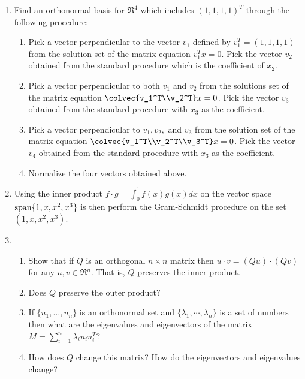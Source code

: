 \begin{enumerate}




\item Find an orthonormal  basis for $\Re^4$ which includes $(1,1,1,1)^T$ through the following procedure:\\
\begin{enumerate} 
\item Pick a vector perpendicular to the vector $v_1$ defined by $v_1^T=(1,1,1,1)$ from the solution set of the matrix equation $v_1^Tx=0$. Pick the vector $v_2$ obtained from the standard procedure which is the coefficient of $x_2$.
\item Pick a vector perpendicular to both $v_1$ and $v_2$ from the solutions set of the matrix equation $\colvec{v_1^T\\v_2^T}x=0$. Pick the vector $v_3$ obtained from the standard procedure with $x_3$ as the coefficient. 
\item Pick a vector perpendicular to $v_1,v_2,$ and $v_3$ from the solution set of the matrix equation $\colvec{v_1^T\\v_2^T\\v_3^T}x=0$.  Pick the vector $v_4$ obtained from the standard procedure with $x_3$ as the coefficient. 
\item Normalize the four vectors obtained   above.
\end{enumerate}


\item Using the inner product $f\cdot g = \int_0^1 f(x)g(x)dx$  on the vector space ${\rm span} \{ 1,x,x^2,x^3\}$ is then perform the Gram-Schmidt procedure on the set $( 1,x,x^2,x^3)$. 

\item 
\begin{enumerate}
\item
Show that if $Q$ is an orthogonal $n\times n$ matrix then $u\cdot v = (Qu)\cdot (Qv)$ for any $u,v\in \Re^n$. That is, $Q$ preserves the inner product. 
\item Does $Q$ preserve the outer product? 
\item  If $\{ u_1,\dots,u_n\}$ is an orthonormal set and $\{ \lambda_1,\cdots,\lambda_n\}$ is a set of numbers 
then what are the eigenvalues and eigenvectors of the matrix
$M=\sum_{i=1}^n \lambda_i u_i u_i^T$? 
\item How does $Q$ change this matrix? How do the eigenvectors and eigenvalues change? 

\end{enumerate}












\end{enumerate}
